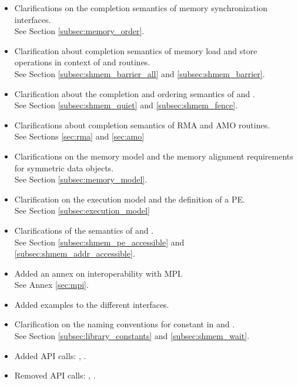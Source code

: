 \begin{itemize}
\item Clarifications on the completion semantics of memory synchronization 
interfaces.\\See Section \ref{subsec:memory_order}.
\item Clarification about completion semantics of memory load and store 
operations in context of  and  
routines.\\See Section \ref{subsec:shmem_barrier_all} and \ref{subsec:shmem_barrier}.
\item Clarification about the completion and ordering semantics of  and .
\\See Section \ref{subsec:shmem_quiet} and \ref{subsec:shmem_fence}.
\item Clarifications about completion semantics of \ac{RMA} and \ac{AMO} routines.
\\See Sections \ref{sec:rma} and \ref{sec:amo}
\item Clarifications on the memory model and the memory alignment requirements for symmetric data objects.
\\See Section \ref{subsec:memory_model}.
\item Clarification on the execution model and the definition of a \ac{PE}.
\\See Section \ref{subsec:execution_model}
\item Clarifications of the semantics of  and .
\\See Section \ref{subsec:shmem_pe_accessible} and \ref{subsec:shmem_addr_accessible}.
\item Added an annex on interoperability with \ac{MPI}.\\See Annex \ref{sec:mpi}.
\item Added examples to the different interfaces.
\item Clarification on the naming conventions for constant in \Clang{} and \Fortran{}.
\\See Section \ref{subsec:library_constants} and \ref{subsec:shmem_wait}.
\item Added \ac{API} calls: , . 
\item Removed \ac{API} calls: , . 
\end{itemize}
